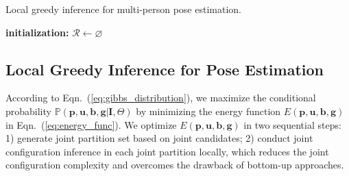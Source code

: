 \documentclass[10pt,twocolumn,letterpaper]{article}
\begin{document}
\begin{algorithm}[t!]\small%
	\caption{Local greedy inference for multi-person pose estimation. }
	\label{alg:greedy_infer_alg}
	 
		 \textbf{initialization:}  $\mathcal{R} \leftarrow \varnothing$ \\
	\label{alg:local_greedy_search}
\end{algorithm}

\subsection{Local Greedy Inference for Pose Estimation}

According to Eqn.~(\ref{eq:gibbs_distribution}), we maximize the conditional probability $\mathbb{P}(\mathbf{p}, \mathbf{u}, \mathbf{b}, \mathbf{g} | \mathbf{I}, \Theta)$ by minimizing the energy function $E(\mathbf{p}, \mathbf{u}, \mathbf{b}, \mathbf{g})$ in Eqn.~(\ref{eq:energy_func}). We  optimize $E(\mathbf{p}, \mathbf{u}, \mathbf{b}, \mathbf{g})$ in two sequential steps: 1) generate joint partition set based on joint candidates;
2) conduct  joint configuration inference in each joint partition locally, which reduces the joint configuration complexity and overcomes the drawback of bottom-up approaches.
\end{document}
